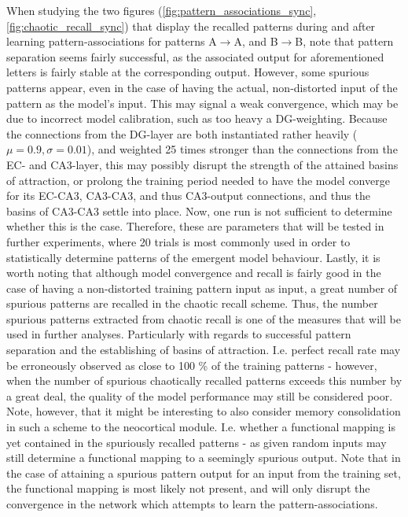 When studying the two figures (\ref{fig:pattern_associations_sync}, \ref{fig:chaotic_recall_sync}) that display the recalled patterns during and after learning pattern-associations for patterns A$\rightarrow$A, and B$\rightarrow$B, note that pattern separation seems fairly successful, as the associated output for aforementioned letters is fairly stable at the corresponding output. However, some spurious patterns appear, even in the case of having the actual, non-distorted input of the pattern as the model's input. This may signal a weak convergence, which may be due to incorrect model calibration, such as too heavy a DG-weighting. Because the connections from the DG-layer are both instantiated rather heavily ($\mu=0.9, \sigma=0.01$), and weighted 25 times stronger than the connections from the EC- and CA3-layer, this may possibly disrupt the strength of the attained basins of attraction, or prolong the training period needed to have the model converge for its EC-CA3, CA3-CA3, and thus CA3-output connections, and thus the basins of CA3-CA3 settle into place. Now, one run is not sufficient to determine whether this is the case. Therefore, these are parameters that will be tested in further experiments, where 20 trials is most commonly used in order to statistically determine patterns of the emergent model behaviour.
Lastly, it is worth noting that although model convergence and recall is fairly good in the case of having a non-distorted training pattern input as input, a great number of spurious patterns are recalled in the chaotic recall scheme. Thus, the number spurious patterns extracted from chaotic recall is one of the measures that will be used in further analyses. Particularly with regards to successful pattern separation and the establishing of basins of attraction. I.e. perfect recall rate may be erroneously observed as close to 100 \% of the training patterns - however, when the number of spurious chaotically recalled patterns exceeds this number by a great deal, the quality of the model performance may still be considered poor. Note, however, that it might be interesting to also consider memory consolidation in such a scheme to the neocortical module. I.e. whether a functional mapping is yet contained in the spuriously recalled patterns - as given random inputs may still determine a functional mapping to a seemingly spurious output. Note that in the case of attaining a spurious pattern output for an input from the training set, the functional mapping is most likely not present, and will only disrupt the convergence in the network which attempts to learn the pattern-associations.


